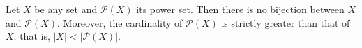 \documentclass[12pt]{article}
\def\P{{\mathcal P}}
\begin{document}
Let $X$ be any set and $\P(X)$ its power set. Then there is no bijection between $X$ and $\P(X)$. Moreover, the cardinality of $\P(X)$ is strictly greater than that of $X$; that is, $|X|<|\P(X)|$.
\end{document}
